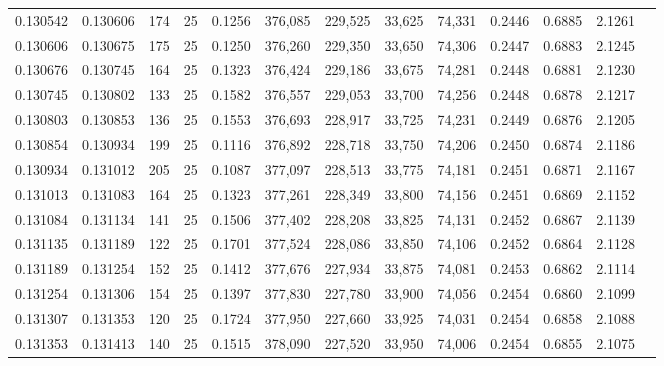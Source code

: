 \begin{tabular}{rrrrrrrrrrrrr}
0.130542 & 0.130606 &   174 &  25 &                                     0.1256 & 376,085 & 229,525 &  33,625 &  74,331 & 0.2446 & 0.6885 & 2.1261 \\
0.130606 & 0.130675 &   175 &  25 &                                     0.1250 & 376,260 & 229,350 &  33,650 &  74,306 & 0.2447 & 0.6883 & 2.1245 \\
0.130676 & 0.130745 &   164 &  25 &                                     0.1323 & 376,424 & 229,186 &  33,675 &  74,281 & 0.2448 & 0.6881 & 2.1230 \\
0.130745 & 0.130802 &   133 &  25 &                                     0.1582 & 376,557 & 229,053 &  33,700 &  74,256 & 0.2448 & 0.6878 & 2.1217 \\
0.130803 & 0.130853 &   136 &  25 &                                     0.1553 & 376,693 & 228,917 &  33,725 &  74,231 & 0.2449 & 0.6876 & 2.1205 \\
0.130854 & 0.130934 &   199 &  25 &                                     0.1116 & 376,892 & 228,718 &  33,750 &  74,206 & 0.2450 & 0.6874 & 2.1186 \\
0.130934 & 0.131012 &   205 &  25 &                                     0.1087 & 377,097 & 228,513 &  33,775 &  74,181 & 0.2451 & 0.6871 & 2.1167 \\
0.131013 & 0.131083 &   164 &  25 &                                     0.1323 & 377,261 & 228,349 &  33,800 &  74,156 & 0.2451 & 0.6869 & 2.1152 \\
0.131084 & 0.131134 &   141 &  25 &                                     0.1506 & 377,402 & 228,208 &  33,825 &  74,131 & 0.2452 & 0.6867 & 2.1139 \\
0.131135 & 0.131189 &   122 &  25 &                                     0.1701 & 377,524 & 228,086 &  33,850 &  74,106 & 0.2452 & 0.6864 & 2.1128 \\
0.131189 & 0.131254 &   152 &  25 &                                     0.1412 & 377,676 & 227,934 &  33,875 &  74,081 & 0.2453 & 0.6862 & 2.1114 \\
0.131254 & 0.131306 &   154 &  25 &                                     0.1397 & 377,830 & 227,780 &  33,900 &  74,056 & 0.2454 & 0.6860 & 2.1099 \\
0.131307 & 0.131353 &   120 &  25 &                                     0.1724 & 377,950 & 227,660 &  33,925 &  74,031 & 0.2454 & 0.6858 & 2.1088 \\
0.131353 & 0.131413 &   140 &  25 &                                     0.1515 & 378,090 & 227,520 &  33,950 &  74,006 & 0.2454 & 0.6855 & 2.1075 \\

\end{tabular}
